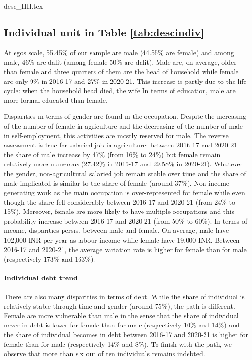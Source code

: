 \documentclass[a4paper, 11pt, onecolumn]{article}
\begin{document}
{desc_HH.tex}

\subsection{Individual unit in Table \ref{tab:descindiv}}
At egos scale, 55.45\% of our sample are male (44.55\% are female) and among male, 46\% are dalit (among female 50\% are dalit).
Male are, on average, older than female and three quarters of them are the head of household while female are only 9\% in 2016-17 and 27\% in 2020-21.
This increase is partly due to the life cycle: when the household head died, the wife 
In terms of education, male are more formal educated than female.

Disparities in terms of gender are found in the occupation.
Despite the increasing of the number of female in agriculture and the decreasing of the number of male in self-employment, this activities are mostly reserved for male.
The reverse assessment is true for salaried job in agriculture: between 2016-17 and 2020-21 the share of male increase by 47\% (from 16\% to 24\%) but female remain relatively more numerous (27.42\% in 2016-17 and 29.58\% in 2020-21). 
Whatever the gender, non-agricultural salaried job remain stable over time and the share of male implicated is similar to the share of female (around 37\%).
Non-income generating work as the main occupation is over-represented for female while even though the share fell considerably between 2016-17 and 2020-21 (from 24\% to 15\%).
Moreover, female are more likely to have multiple occupations and this probability increase between 2016-17 and 2020-21 (from 50\% to 60\%).
In terms of income, disparities persist between male and female.
On average, male have 102,000 INR per year as labour income while female have 19,000 INR.
Between 2016-17 and 2020-21, the average variation rate is higher for female than for male (respectively 173\% and 163\%).

\paragraph{Individual debt trend}
There are also many disparities in terms of debt.
While the share of individual is relatively stable through time and gender (around 75\%), the path is different.
Female are more vulnerable than male in the sense that the share of individual never in debt is lower for female than for male (respectively 10\% and 14\%) and the share of individual becomes in debt between 2016-17 and 2020-21 is higher for female than for male (respectively 14\% and 8\%).
To finish with the path, we observe that more than six out of ten individuals remains indebted.
\end{document}
